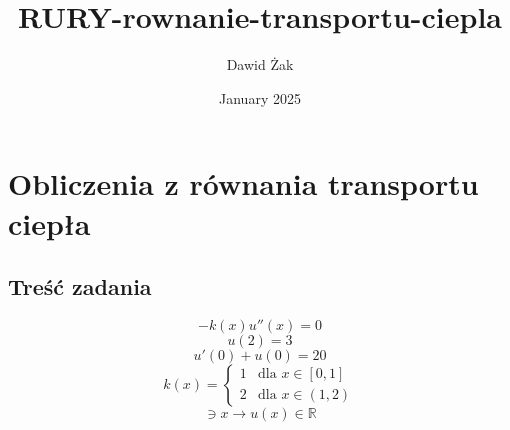 \documentclass{article}
\title{RURY-rownanie-transportu-ciepla}
\author{Dawid Żak}
\date{January 2025}
\begin{document}
\maketitle

\section{Obliczenia z równania transportu ciepła}
\subsection{Treść zadania}
\begin{equation}
    -k(x)u''(x)=0
\end{equation}
\begin{equation}
    u(2) = 3
\end{equation}
\begin{equation}
    u'(0)+u(0)=20
    \label{brzeg}
\end{equation}
\begin{equation}
    k(x) =
    \begin{cases}
        1 & \text{dla } x \in [0, 1] \\
        2 & \text{dla } x \in (1, 2)
    \end{cases}
    \label{eq:piecewise}
\end{equation}
\begin{equation*}
    [0,2]\ni x \rightarrow u(x) \in \mathbb{R}
\end{equation*}
\end{document}
